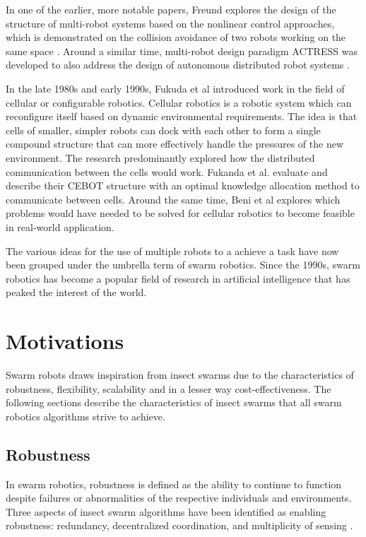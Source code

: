 In one of the earlier, more notable papers, Freund explores the design of the structure of multi-robot systems based on the nonlinear control approaches, which is demonstrated on the collision avoidance of two robots working on the same space \cite{freund1984design,freund1986pathfinding}. Around a similar time, multi-robot design paradigm ACTRESS was developed to also address the design of autonomous distributed robot systems \cite{asama1989design}. 

In the late 1980s and early 1990s, Fukuda et al \cite{fukuda1989communication,fukuda1990analysis} introduced work in the field of cellular or configurable robotics. Cellular robotics is a robotic system which can reconfigure itself based on dynamic environmental requirements. The idea is that cells of smaller, simpler robots can dock with each other to form a single compound structure that can more effectively handle the pressures of the new environment. The research predominantly explored how the distributed communication between the cells would work. Fukanda et al. evaluate and describe their CEBOT structure with an optimal knowledge allocation method to communicate between cells. 
Around the same time, Beni et al \cite{beni1991theoretical} explores which problems would have needed to be solved for cellular robotics to become feasible in real-world application.

The various ideas for the use of multiple robots to a achieve a task have now been grouped under the umbrella term of swarm robotics. Since the 1990s, swarm robotics has become a popular field of research in artificial intelligence that has peaked the interest of the world. 

\section{Motivations}
\label{sec:first:advantages}

Swarm robots draws inspiration from insect swarms due to the characteristics of robustness, flexibility, scalability and in a lesser way cost-effectiveness. The following sections describe the characteristics of insect swarms that all swarm robotics algorithms strive to achieve. 

\subsection{Robustness}
\label{robustness}


In swarm robotics, robustness is defined as the ability to continue to function despite failures or abnormalities of the respective individuals and environments. Three aspects of insect swarm algorithms have been identified as enabling robustness: redundancy, decentralized coordination, and multiplicity of sensing \cite{csahin2005swarm}.

